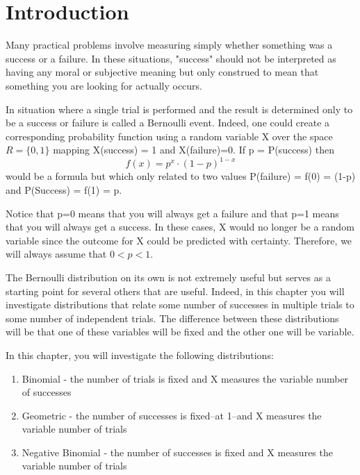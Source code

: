 \documentclass[10pt,]{book}
\theoremstyle{plain}
\theoremstyle{definition}
\theoremstyle{definition}
\theoremstyle{definition}
\numberwithin{equation}{section}
\begin{document}
\section[{Introduction}]{Introduction}\label{section-35}
Many practical problems involve measuring simply whether something was a success or a failure. In these situations, "success" should not be interpreted as having any moral or subjective meaning but only construed to mean that something you are looking for actually occurs.%
\par
In situation where a single trial is performed and the result is determined only to be a success or failure is called a Bernoulli event. Indeed, one could create a corresponding probability function using a random variable X over the space \(R = \{0, 1 \}\) mapping X(success) = 1 and X(failure)=0. If p = P(success) then 
	\begin{equation*}f(x) = p^x \cdot (1-p)^{1-x}\end{equation*}
	would be a formula but which only related to two values P(failure) = f(0) = (1-p) and P(Success) = f(1) = p.  
\par
Notice that p=0 means that you will always get a failure and that p=1 means that you will always get a success. In these cases, X would no longer be a random variable since the outcome for X could be predicted with certainty. Therefore, we will always assume that \(0 < p < 1\).
\par

	The Bernoulli distribution on its own is not extremely useful but serves as a starting point for several others that are useful.  Indeed, in this chapter you will investigate distributions that relate some number of successes in multiple trials to some number of independent trials. The difference between these distributions will be that one of these variables will be fixed and the other one will be variable.
%
\par

In this chapter, you will investigate the following distributions:
\leavevmode%
\begin{enumerate}
\item\hypertarget{li-252}{}Binomial - the number of trials is fixed and X measures the variable number of successes%
\item\hypertarget{li-253}{}Geometric - the number of successes is fixed--at 1--and X measures the variable number of trials%
\item\hypertarget{li-254}{}Negative Binomial - the number of successes is fixed and X measures the variable number of trials%
\end{enumerate}
\end{document}
